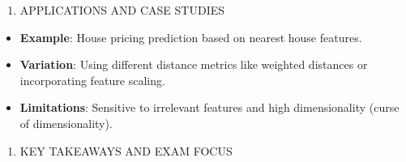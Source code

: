 \documentclass[
  12pt,
]{report}
\providecommand{\tightlist}{%
  \setlength{\itemsep}{0pt}\setlength{\parskip}{0pt}}
\begin{document}
\begin{enumerate}
\def\labelenumi{\arabic{enumi}.}
\setcounter{enumi}{2}
\tightlist
\item
  APPLICATIONS AND CASE STUDIES
\end{enumerate}

\begin{itemize}
\tightlist
\item
  \textbf{Example}: House pricing prediction based on nearest house features.
\item
  \textbf{Variation}: Using different distance metrics like weighted distances or incorporating feature scaling.
\item
  \textbf{Limitations}: Sensitive to irrelevant features and high dimensionality (curse of dimensionality).
\end{itemize}

\begin{enumerate}
\def\labelenumi{\arabic{enumi}.}
\setcounter{enumi}{3}
\tightlist
\item
  KEY TAKEAWAYS AND EXAM FOCUS
\end{enumerate}
\end{document}
